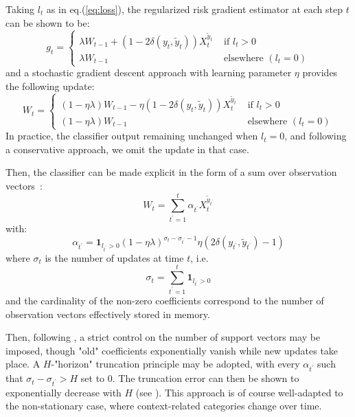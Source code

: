 \documentclass[preprint,12pt,authoryear]{elsarticle}
\begin{document}
Taking $l_t$ as in eq.(\ref{eq:loss}), the regularized risk gradient estimator at each step $t$ can be shown to be:
$$g_t = \left\{
\begin{array}{ll}
\lambda W_{t-1} + (1 - 2 \delta(y_t,\tilde{y}_t)) X_t^{\tilde{y}_t} &\text{ if } l_t > 0\\
\lambda W_{t-1} &\text{ elsewhere }(l_t=0)
\end{array}
\right.$$
and a stochastic gradient descent approach with learning parameter $\eta$ provides the following update:
$$W_t =  \left\{
\begin{array}{ll}
(1-\eta\lambda) W_{t-1} - \eta (1 - 2 \delta(y_t,\tilde{y}_t)) X_t^{\tilde{y}_t} &\text{ if } l_t > 0\\
(1-\eta\lambda) W_{t-1} &\text{ elsewhere }(l_t = 0)
\end{array}
\right.$$
In practice, the classifier output remaining unchanged when $l_t = 0$, and following a conservative approach, we omit the update in that case. 

Then, the classifier can be made explicit in the form of a sum over observation vectors~:
$$W_t = \sum_{t^\prime=1}^t \alpha_{t^\prime} X_t^{\tilde{y}_{t^\prime}}$$
with:
$$\alpha_{t^\prime} = \mathbf{1}_{l_{t^\prime} > 0}(1 - \eta \lambda)^{\sigma_t - \sigma_{t^\prime}-1}  \eta (2\delta(y_{t^\prime},\tilde{y}_{t^\prime})-1)$$
where $\sigma_t$ is the number of updates at time $t$, i.e.
$$\sigma_t = \sum_{t^\prime=1}^t \mathbf{1}_{l_{t^\prime} > 0}$$  
and the cardinality of the non-zero coefficients correspond to the number of observation vectors effectively stored in memory.

Then, following \cite{kivinen2004online}, a strict control on the number of support  vectors may be imposed, though "old" coefficients exponentially vanish while new updates take place. A $H$-"horizon" truncation principle may be adopted, with every $\alpha_{t^\prime}$ such that $\sigma_t - \sigma_{t^\prime} > H$ set to 0. The truncation error can then be shown to  exponentially decrease with $H$ (see \cite{kivinen2004online}). This approach is of course well-adapted to the non-stationary case, where context-related categories change over time.
\end{document}
